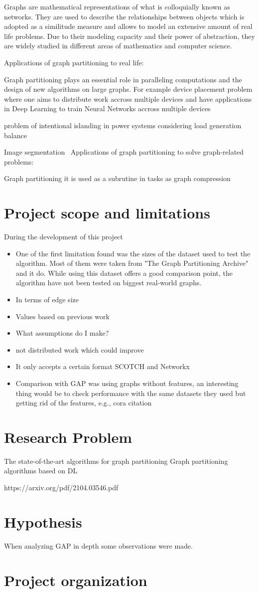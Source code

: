 Graphs are mathematical representations of what is colloquially known as networks. They are used to describe the relationships between objects which is adopted as a similitude measure and allows to model an extensive amount of real life problems. Due to their modeling capacity and their power of abstraction, they are widely studied in different areas of mathematics and computer science. 

Applications of graph partitioning to real life:

Graph partitioning plays an essential role in paralleling computations and the design of new algorithms on large graphs. For example device placement problem where one aims to distribute work accross multiple devices and have applications in Deep Learning to train Neural Networks accross multiple devices \cite{deviceplacement} 

problem of intentional islanding in power systems considering load generation balance ~ \cite{islanding}

Image segmentation~\cite{imagesegmentation}
Applications of graph partitioning to solve graph-related problems:

Graph partitioning it is used as a subrutine in tasks as graph compression ~ \cite{compressgraphs}
\section{Project scope and limitations }
During the development of this project 
\begin{itemize}
    \item One of the first limitation found was the sizes of the dataset used to test the algorithm. Most of them were taken from "The Graph Partitioning Archive" and it do. While using this dataset offers a good comparison point, the algorithm have not been tested on biggest real-world graphs.
    \item In terms of edge size
    \item Values based on previous work
    \item What assumptions do I make?
    \item not distributed work which could improve
    \item It only accepts a certain format SCOTCH and Networkx
    \item Comparison with GAP was using graphs without features, an interesting thing would be to check performance with the same datasets they used but getting rid of the features, e.g., cora citation
\end{itemize}

\section{Research Problem}
The state-of-the-art algorithms for graph partitioning 
Graph partitioning algorithms based on DL

https://arxiv.org/pdf/2104.03546.pdf
\section{Hypothesis}
When analyzing GAP in depth some observations were made.

\section{Project organization}

